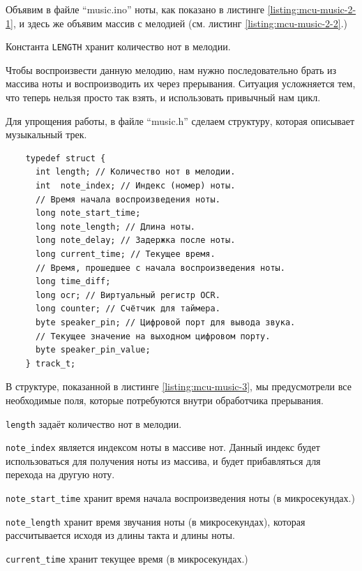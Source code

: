 \documentclass[../sparc.tex]{subfiles}
\begin{document}
Объявим в файле ``music.ino'' ноты, как показано в листинге
\ref{listing:mcu-music-2-1}, и здесь же объявим массив с мелодией (см. листинг
\ref{listing:mcu-music-2-2}.)

Константа \texttt{LENGTH} хранит количество нот в мелодии.

Чтобы воспроизвести данную мелодию, нам нужно последовательно брать из массива
ноты и воспроизводить их через прерывания.  Ситуация усложняется тем, что теперь
нельзя просто так взять, и использовать привычный нам цикл.

Для упрощения работы, в файле ``music.h'' сделаем структуру, которая описывает
музыкальный трек.

\begin{listing}[H]
  \begin{verbatim}
    typedef struct {
      int length; // Количество нот в мелодии.
      int  note_index; // Индекс (номер) ноты.
      // Время начала воспроизведения ноты.
      long note_start_time;
      long note_length; // Длина ноты.
      long note_delay; // Задержка после ноты.
      long current_time; // Текущее время.
      // Время, прошедшее с начала воспроизведения ноты.
      long time_diff;
      long ocr; // Виртуальный регистр OCR.
      long counter; // Счётчик для таймера.
      byte speaker_pin; // Цифровой порт для вывода звука.
      // Текущее значение на выходном цифровом порту.
      byte speaker_pin_value;
    } track_t;
  \end{verbatim}
  \caption{Структура, описывающая музыкальный трек.}
  \label{listing:mcu-music-3}
\end{listing}

В структуре, показанной в листинге \ref{listing:mcu-music-3}, мы предусмотрели
все необходимые поля, которые потребуются внутри обработчика прерывания.

\texttt{length} задаёт количество нот в мелодии.

\texttt{note_index} является индексом ноты в массиве нот.  Данный
индекс будет использоваться для получения ноты из массива, и будет прибавляться
для перехода на другую ноту.

\texttt{note_start_time} хранит время начала воспроизведения ноты (в
микросекундах.)

\texttt{note_length} хранит время звучания ноты (в микросекундах),
которая рассчитывается исходя из длины такта и длины ноты.

\texttt{current_time} хранит текущее время (в микросекундах.)
\end{document}
